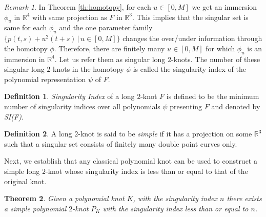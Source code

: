 \documentclass[10pt,a4paper,reqno]{amsart}
\newtheorem{theorem}{Theorem}[section]
\theoremstyle{definition}
\newtheorem{definition}{Definition}[section]
\theoremstyle{remark}
\newtheorem{remark}[theorem]{Remark}
\newcommand{\R}{\mathbb R}
\begin{document}
 \begin{remark}
 	In Theorem \ref{th:homotopy}, for each $u \in [0,M]$ we get an immersion $\phi_{u}$ in $\R^{4}$ with same projection as $F$ in $\R^{3}$. This implies that the singular set is same for each $\phi_{u}$ and the one parameter family $\{p(t,s)+u^{2}(t+s) \, \vert \, u \in [0,M]\}$ changes the over/under information through the homotopy $\phi$. Therefore, there are finitely many $ u \in [0,M]$ for which $\phi_{u}$ is an immersion in $\R^{4}$. Let us refer them as  singular long $2$-knots. The number of these singular long $2$-knots in the homotopy $\phi$ is called the singularity index of the polynomial representation $\psi$ of $F$.
 \end{remark}
 \begin{definition}
 	{\it Singularity Index} of a  long $2$-knot $F$ is defined to be the minimum number of singularity indices over all polynomials $\psi$ presenting $F$ and denoted by {\it SI(F)}.
 \end{definition}
 \begin{definition}
 	A long $2$-knot is said to be {\it simple} if it has a projection on some $\R^3$ such that a singular set consists of finitely many double point curves only. 
 \end{definition}
 Next, we establish that any classical polynomial knot can be used to construct a simple long $2$-knot whose singularity index is less than or equal to that of the original knot.
 \begin{theorem}\label{th:sing_index}
 	Given a polynomial knot $K$, with the  singularity index $n$ there exists a simple polynomial $2$-knot $P_K$ with the singularity index less than or equal to $n$.
 \end{theorem}
\end{document}
